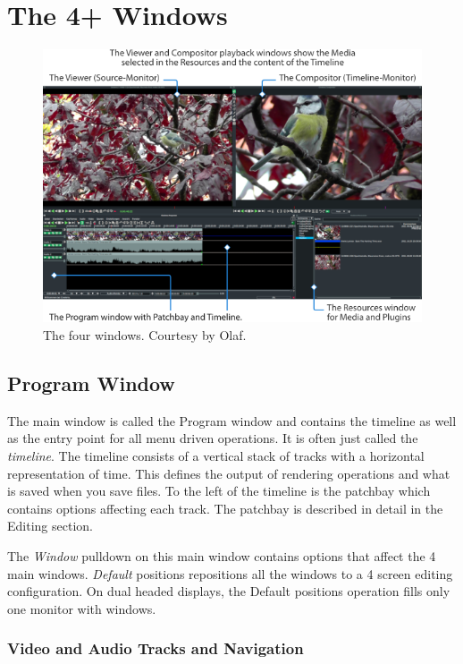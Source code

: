 \chapter{The 4+ Windows}%
\label{cha:the_4_windows}

\begin{figure}[htpb]
    \centering
    \includegraphics[width=0.9\linewidth]{images/Fenstergrundposition-en.png}
    \caption{The four windows. Courtesy by Olaf.}
    \label{fig:Fenstergrundposition-en}
\end{figure}

\section{Program Window}%
\label{sec:program_window}

The main window is called the Program window and contains the timeline as well as the entry point for all menu driven operations.  
It is often just called the \textit{timeline}.  
The timeline consists of a vertical stack of tracks with a horizontal representation of time. 
This defines the output of rendering operations and what is saved when you save files. 
To the left of the timeline is the patchbay which contains options affecting each track.  
The patchbay is described in detail in the Editing section.

The \emph{Window} pulldown on this main window contains options that affect the 4 main windows. 
\emph{Default} positions repositions all the windows to a 4 screen editing configuration.
On dual headed displays,
the Default positions operation fills only one monitor with windows.

\subsection{Video and Audio Tracks and Navigation}%
\label{sub:video_and_audio_tracks_and_navigation}

